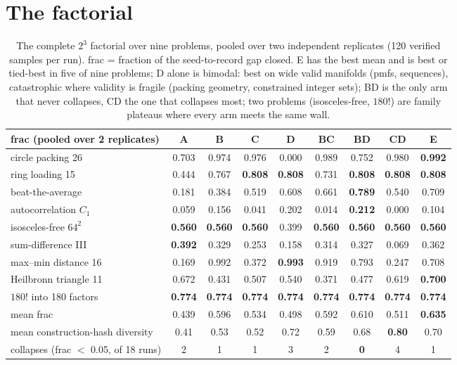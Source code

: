\documentclass[11pt]{article}
\begin{document}
\section{The factorial}
\label{sec:factorial}

\begin{table}[t]
\centering\small
\begin{tabular}{@{}lcccccccc@{}}
\toprule
frac (pooled over 2 replicates) & A & B & C & D & BC & BD & CD & E \\
\midrule
circle packing 26 & 0.703 & 0.974 & 0.976 & 0.000 & 0.989 & 0.752 & 0.980 & \textbf{0.992} \\
ring loading 15 & 0.444 & 0.767 & \textbf{0.808} & \textbf{0.808} & 0.731 & \textbf{0.808} & \textbf{0.808} & \textbf{0.808} \\
beat-the-average & 0.181 & 0.384 & 0.519 & 0.608 & 0.661 & \textbf{0.789} & 0.540 & 0.709 \\
autocorrelation $C_1$ & 0.059 & 0.156 & 0.041 & 0.202 & 0.014 & \textbf{0.212} & 0.000 & 0.104 \\
isosceles-free $64^2$ & \textbf{0.560} & \textbf{0.560} & \textbf{0.560} & 0.399 & \textbf{0.560} & \textbf{0.560} & \textbf{0.560} & \textbf{0.560} \\
sum-difference III & \textbf{0.392} & 0.329 & 0.253 & 0.158 & 0.314 & 0.327 & 0.069 & 0.362 \\
max--min distance 16 & 0.169 & 0.992 & 0.372 & \textbf{0.993} & 0.919 & 0.793 & 0.247 & 0.708 \\
Heilbronn triangle 11 & 0.672 & 0.431 & 0.507 & 0.540 & 0.371 & 0.477 & 0.619 & \textbf{0.700} \\
$180!$ into 180 factors & \textbf{0.774} & \textbf{0.774} & \textbf{0.774} & \textbf{0.774} & \textbf{0.774} & \textbf{0.774} & \textbf{0.774} & \textbf{0.774} \\
\midrule
mean frac & 0.439 & 0.596 & 0.534 & 0.498 & 0.592 & 0.610 & 0.511 & \textbf{0.635} \\
mean construction-hash diversity & 0.41 & 0.53 & 0.52 & 0.72 & 0.59 & 0.68 & \textbf{0.80} & 0.70 \\
collapses (frac $<$ 0.05, of 18 runs) & 2 & 1 & 1 & 3 & 2 & \textbf{0} & 4 & 1 \\
\bottomrule
\end{tabular}
\caption{The complete $2^3$ factorial over nine problems, pooled over two
independent replicates (120 verified samples per run). frac = fraction of
the seed-to-record gap closed. E has the best mean and is best or
tied-best in five of nine problems; D alone is bimodal: best on wide
valid manifolds (pmfs, sequences), catastrophic where validity is fragile
(packing geometry, constrained integer sets); BD is the only arm that
never collapses, CD the one that collapses most; two problems
(isosceles-free, $180!$) are family plateaus where every arm meets the
same wall.}
\label{tab:factorial}
\end{table}
\end{document}
